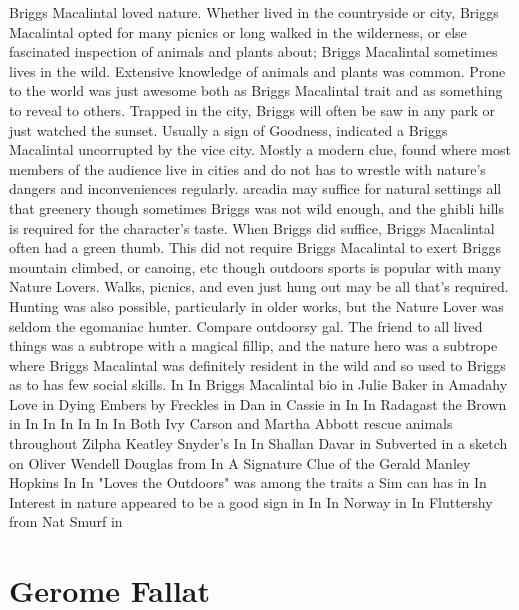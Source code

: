 \documentclass[12pt]{book}
\begin{document}
Briggs Macalintal loved nature. Whether lived in the countryside or city, Briggs Macalintal opted for many picnics or long walked in the wilderness, or else fascinated inspection of animals and plants about; Briggs Macalintal sometimes lives in the wild. Extensive knowledge of animals and plants was common. Prone to the world was just awesome both as Briggs Macalintal trait and as something to reveal to others. Trapped in the city, Briggs will often be saw in any park or just watched the sunset. Usually a sign of Goodness, indicated a Briggs Macalintal uncorrupted by the vice city. Mostly a modern clue, found where most members of the audience live in cities and do not has to wrestle with nature's dangers and inconveniences regularly. arcadia may suffice for natural settings  all that greenery  though sometimes Briggs was not wild enough, and the ghibli hills is required for the character's taste. When Briggs did suffice, Briggs Macalintal often had a green thumb. This did not require Briggs Macalintal to exert Briggs  mountain climbed, or canoing, etc  though outdoors sports is popular with many Nature Lovers. Walks, picnics, and even just hung out may be all that's required. Hunting was also possible, particularly in older works, but the Nature Lover was seldom the egomaniac hunter. Compare outdoorsy gal. The friend to all lived things was a subtrope with a magical fillip, and the nature hero was a subtrope where Briggs Macalintal was definitely resident in the wild and so used to Briggs as to has few social skills. In In Briggs Macalintal bio in Julie Baker in Amadahy Love in Dying Embers by Freckles in Dan in Cassie in In In Radagast the Brown in In In In In In In Both Ivy Carson and Martha Abbott rescue animals throughout Zilpha Keatley Snyder's In In Shallan Davar in Subverted in a sketch on Oliver Wendell Douglas from In A Signature Clue of the Gerald Manley Hopkins In In "Loves the Outdoors" was among the traits a Sim can has in In Interest in nature appeared to be a good sign in In In Norway in In Fluttershy from Nat Smurf in



\chapter{Gerome Fallat}
\end{document}
